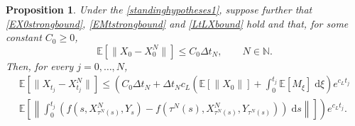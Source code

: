 \documentclass[reqno,12pt]{amsart}
\theoremstyle{plain} %
\newtheorem{proposition}{Proposition}[section]
\theoremstyle{definition} %
\begin{document}
\begin{proposition}
    \label{propbasicestimate}
    Under the \cref{standinghypotheses1}, suppose further that \eqref{EX0strongbound}, \eqref{EMtstrongbound} and \eqref{LtLXbound} hold and that, for some constant $C_0 \geq 0$, 
    \begin{equation}
        \label{EX0X0N}
        \mathbb{E}[\|X_0 - X_0^N\|] \leq C_0 \Delta t_N, \qquad N\in \mathbb{N}.
    \end{equation}
    Then, for every $j = 0, \ldots, N$,
    \begin{multline}
        \label{expectedestimateglobalerrorintegral}
            \mathbb{E} \left[\|X_{t_j} - X_{t_j}^N\|\right] \leq \left( C_0 \Delta t_N + \Delta t_N c_L \left(\mathbb{E}[\|X_0\|] + \int_0^{t_j} \mathbb{E}[M_\xi]\;\mathrm{d}\xi\right)e^{c_L t_j}\right. \\
            \left. \mathbb{E}\left[\left\|\int_0^{t_j} \left( f(s, X_{\tau^N(s)}^N, Y_s) - f(\tau^N(s), X_{\tau^N(s)}^N, Y_{\tau^N(s)}) \right)\;\mathrm{d}s\right\|\right]\right) e^{c_L t_j}.
    \end{multline}
\end{proposition}
\end{document}
